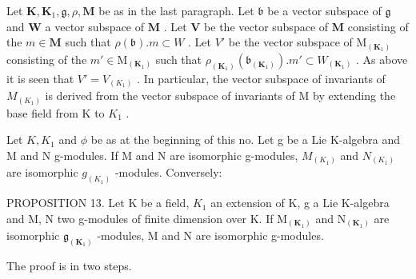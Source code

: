 Let \(\mathbf{K}, \mathbf{K}_{1}, \mathfrak{g}, \rho, \mathbf{M}\) be as in the last paragraph. Let \(\mathfrak{b}\) be a vector subspace of \(\mathfrak{g}\) and \(\mathbf{W}\) a vector subspace of \(\mathbf{M}\) . Let \(\mathbf{V}\) be the vector subspace of \(\mathbf{M}\) consisting of the \(m \in \mathbf{M}\) such that \(\rho(\mathfrak{b}). m \subset W\) . Let \(V'\) be the vector subspace of \(\mathrm{M}_{(\mathbf{K}_{1})}\) consisting of the \(m' \in \mathrm{M}_{(\mathbf{K}_{1})}\) such that \(\rho_{(\mathbf{K}_{1})}(\mathfrak{b}_{(\mathbf{K}_{1})}). m' \subset W_{(\mathbf{K}_{1})}\) . As above it is seen that \(V' = V_{(K_1)}\) . In particular, the vector subspace of invariants of \(M_{(K_1)}\) is derived from the vector subspace of invariants of M by extending the base field from K to \(K_1\) .

Let \(K, K_{1}\) and \(\phi\) be as at the beginning of this no. Let g be a Lie K-algebra and M and N g-modules. If M and N are isomorphic g-modules, \(M_{(K_{1})}\) and \(N_{(K_{1})}\) are isomorphic \(g_{(K_{1})}\) -modules. Conversely:

PROPOSITION 13. Let K be a field, \(K_{1}\) an extension of K, g a Lie K-algebra and M, N two g-modules of finite dimension over K. If \(\mathrm{M}_{(\mathbf{K}_{1})}\) and \(\mathrm{N}_{(\mathbf{K}_{1})}\) are isomorphic \(\mathfrak{g}_{(\mathbf{K}_{1})}\) -modules, M and N are isomorphic g-modules.

The proof is in two steps.


